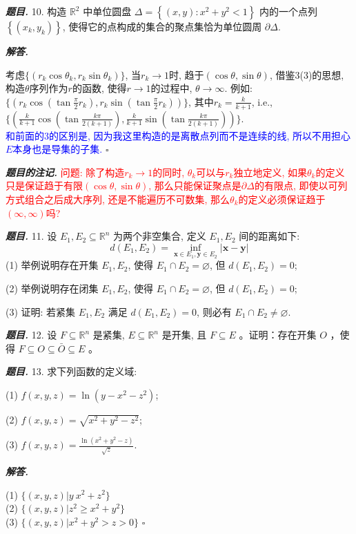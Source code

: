 \documentclass[10pt, a4paper, oneside]{ctexart}
\newenvironment{problem}{\begin{framed}\par\noindent\textbf{\textit{题目. }}}{\end{framed}\par}
\newenvironment{solution}{%
  \par\noindent\textbf{\textit{解答. }}\ignorespaces
}{%
  \hfill\ensuremath{\square}\par %
}
\newenvironment{note}{\par\noindent\textbf{\textit{题目的注记. }}\ignorespaces}{\par}
\begin{document}
\begin{problem}
10. 构造 $\mathbb{R}^2$ 中单位圆盘 $\Delta=\left\{(x, y): x^2+y^2<1\right\}$ 内的一个点列 $\left\{\left(x_k, y_k\right)\right\}$, 使得它的点构成的集合的聚点集恰为单位圆周 $\partial \Delta$.
\end{problem}

\begin{solution}
考虑$\{(r_k\cos \theta_k, r_k \sin \theta_k)\}$, 当$r_k\to 1$时, 趋于$(\cos\theta, \sin\theta)$, 借鉴3(3)的思想, 构造$\theta$序列作为$r$的函数, 使得$r\to 1$的过程中, $\theta\to \infty$. 例如: $\{(r_k\cos(\tan \frac{\pi}{2}r_k),r_k\sin(\tan \frac{\pi}{2}r_k))\}$, 其中$r_k=\frac{k}{k+1}$, i.e., $\{(\frac{k}{k+1}\cos(\tan \frac{k\pi}{2(k+1)}),\frac{k}{k+1}\sin(\tan \frac{k\pi}{2(k+1)}))\}$.\\
\textcolor{blue}{和前面的3的区别是, 因为我这里构造的是离散点列而不是连续的线, 所以不用担心$E$本身也是导集的子集.}
\end{solution}
\begin{note}
    \textcolor{red}{问题: 除了构造$r_k\to 1$的同时, $\theta_k$可以与$r_k$独立地定义, 如果$\theta_k$的定义只是保证趋于有限$(\cos \theta, \sin \theta)$, 那么只能保证聚点是$\partial \Delta$的有限点, 即使以可列方式组合之后成大序列, 还是不能遍历不可数集, 那么$\theta_k$的定义必须保证趋于$(\infty, \infty)$吗?}
\end{note}

\begin{problem}
11. 设 $E_1, E_2 \subseteq \mathbb{R}^n$ 为两个非空集合, 定义 $E_1, E_2$ 间的距离如下:
$$
d\left(E_1, E_2\right)=\inf _{\boldsymbol{x} \in E_1, \boldsymbol{y} \in E_2}|\boldsymbol{x}-\boldsymbol{y}|
$$
(1) 举例说明存在开集 $E_1, E_2$, 使得 $E_1 \cap E_2=\varnothing$, 但 $d\left(E_1, E_2\right)=0$;

(2) 举例说明存在闭集 $E_1, E_2$, 使得 $E_1 \cap E_2=\varnothing$, 但 $d\left(E_1, E_2\right)=0$;

(3) 证明: 若紧集 $E_1, E_2$ 满足 $d\left(E_1, E_2\right)=0$, 则必有 $E_1 \cap E_2 \neq \varnothing$.
\end{problem}

\begin{problem}
12. 设 $F \subseteq \mathbb{R}^n$ 是紧集, $E \subseteq \mathbb{R}^n$ 是开集, 且 $F \subseteq E$ 。证明：存在开集 $O$ ，使得 $F \subseteq O \subseteq \bar{O} \subseteq E$ 。
\end{problem}

\begin{problem}
13. 求下列函数的定义域:

(1) $f(x, y, z)=\ln \left(y-x^2-z^2\right)$;

(2) $f(x, y, z)=\sqrt{x^2+y^2-z^2}$;

(3) $f(x, y, z)=\frac{\ln \left(x^2+y^2-z\right)}{\sqrt{z}}$.
\end{problem}
\begin{solution}
(1) $\{(x,y,z)| y\> x^2+z^2\}$\\
(2) $\{(x,y,z)| z^2\geq x^2+y^2\}$\\
(3) $\{(x,y,z)| x^2+y^2>z>0\}$
\end{solution}
\end{document}
